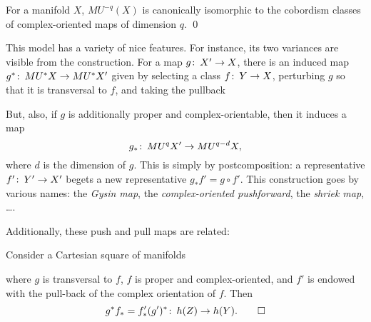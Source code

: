 \begin{theorem}[Thom]
For a manifold $X$, $MU^{-q}(X)$ is canonically isomorphic to the cobordism classes of complex-oriented maps of dimension $q$. \qed
\end{theorem}

\begin{remark}
This model has a variety of nice features.  For instance, its two variances are visible from the construction.  For a map $g\colon\thinspace X' \to X$, there is an induced map $g^*\colon\thinspace MU^* X \to MU^* X'$ given by selecting a class $f\colon\thinspace Y \to X$, perturbing $g$ so that it is transversal to $f$, and taking the pullback
\begin{center}
\end{center}
But, also, if $g$ is additionally proper and complex-orientable, then it induces a map \[g_*\colon\thinspace MU^q X' \to MU^{q-d} X,\] where $d$ is the dimension of $g$.  This is simply by postcomposition: a representative $f'\colon\thinspace Y' \to X'$ begets a new representative $g_* f' = g \circ f'$.  This construction goes by various names: the \textit{Gysin map}, the \textit{complex-oriented pushforward}, the \textit{shriek map}, \ldots.
\end{remark}

Additionally, these push and pull maps are related:
\begin{lemma}\label{PushPullFormulaForMU}
Consider a Cartesian square of manifolds
\begin{center}
\end{center}
where $g$ is transversal to $f$, $f$ is proper and complex-oriented, and $f'$ is endowed with the pull-back of the complex orientation of $f$. Then \[g^* f_* = f'_* (g')^*\colon\thinspace h(Z) \to h(Y). \qed\]
\end{lemma}


